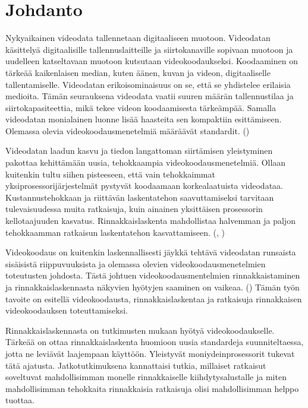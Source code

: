 
\section{Johdanto}

Nykyaikainen videodata tallennetaan digitaaliseen muotoon. Videodatan
käsittelyä digitaalisille tallennuslaitteille ja siirtokanaville sopivaan
muotoon ja uudelleen katseltavaan muotoon kutsutaan videokoodaukseksi.
Koodaaminen on tärkeää kaikenlaisen median, kuten äänen, kuvan ja videon,
digitaaliselle tallentamiselle. Videodatan erikoisominaisuus on se, että
se yhdistelee erilaisia medioita. Tämän seurauksena videodata vaatii suuren
määrän tallennustilaa ja siirtokapasiteettia, mikä tekee videon koodaamisesta
tärkeämpää. Samalla videodatan monialainen luonne lisää haasteita sen
kompaktiin esittämiseen. Olemassa olevia videokoodausmenetelmiä määräävät
standardit. (\citealt{h264})

Videodatan laadun kasvu ja tiedon langattoman siirtämisen yleistyminen pakottaa
kehittämään uusia, tehokkaampia videokoodausmenetelmiä. Ollaan kuitenkin tultu
siihen pisteeseen, että vain tehokkaimmat yksiprosessorijärjestelmät pystyvät
koodaamaan korkealaatuista videodataa. Kustannustehokkaan ja riittävän
laskentatehon saavuttamiseksi tarvitaan tulevaisuudessa muita ratkaisuja, kuin
ainainen yksittäisen prosessorin kellotaajuuden kasvatus. Rinnakkaislaskenta
mahdollistaa halvemman ja paljon tehokkaamman ratkaisun laskentatehon
kasvattamiseen. (\citealt{chi}, \citealt{intro})

Videokoodaus on kuitenkin laskennallisesti jäykkä tehtävä videodatan runsaista
sisäisistä riippuvuuksista ja olemassa olevien videokoodausmenetelmien
toteutusten johdosta. Tästä johtuen videokoodausmentelmien rinnakkaistaminen ja
rinnakkaislaskennasta näkyvien hyötyjen saaminen on vaikeaa.
(\citealt{pieters}) Tämän työn tavoite on esitellä videokoodausta,
rinnakkaislaskentaa ja ratkaisuja rinnakkaisen videokoodauksen toteuttamiseksi.

Rinnakkaislaskennasta on tutkimusten mukaan hyötyä videokoodaukselle. Tärkeää
on ottaa rinnakkaislaskenta huomioon uusia standardeja suunniteltaessa, jotta ne leviävät
laajempaan käyttöön. Yleistyvät moniydeinprosessorit tukevat tätä ajatusta.
Jatkotutkimuksena kannattaisi tutkia, millaiset ratkaisut
soveltuvat mahdollisimman monelle rinnakkaiselle kiihdytysalustalle ja miten
mahdollisimman tehokkaita rinnakkaisia ratkaisuja olisi mahdollisimman helppo
tuottaa.

